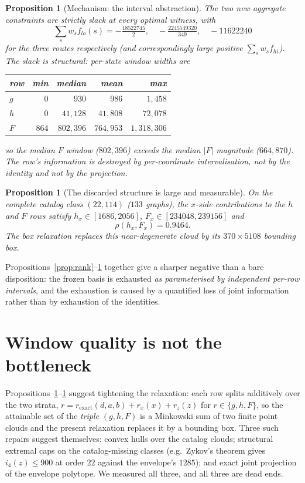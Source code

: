 \documentclass[11pt]{article}
\newtheorem{proposition}[theorem]{Proposition}
\theoremstyle{definition}
\begin{document}
\begin{proposition}[Mechanism: the interval abstraction]\label{prop:mech}
The two new aggregate constraints are strictly slack at every optimal witness,
with
\[
\textstyle\sum_s w_sf_{lo}(s)=-\tfrac{18522745}{2},\quad
-\tfrac{2245549320}{349},\quad -11622240
\]
for the three routes respectively (and correspondingly large positive
$\sum_s w_sf_{hi}$). The slack is structural: per-state window widths are
\begin{center}
\begin{tabular}{lrrrr}
\toprule
row & min & median & mean & max\\
\midrule
$g$ & $0$ & $930$ & $986$ & $1{,}458$\\
$h$ & $0$ & $41{,}128$ & $41{,}808$ & $72{,}078$\\
$F$ & $864$ & $802{,}396$ & $764{,}953$ & $1{,}318{,}306$\\
\bottomrule
\end{tabular}
\end{center}
so the median $F$ window ($802{,}396$) exceeds the median $|F|$ magnitude
($664{,}870$). The row's information is destroyed by per-coordinate
intervalisation, not by the identity and not by the projection.
\end{proposition}

\begin{proposition}[The discarded structure is large and measurable]\label{prop:corr}
On the complete catalog class $(22,114)$ ($133$ graphs), the $x$-side
contributions to the $h$ and $F$ rows satisfy
$h_x\in[1686,2056]$, $F_x\in[234048,239156]$ and
\[
\rho(h_x,F_x)=0.9464 .
\]
The box relaxation replaces this near-degenerate cloud by its
$370\times5108$ bounding box.
\end{proposition}

Propositions~\ref{prop:rank}--\ref{prop:corr} together give a sharper negative
than a bare disposition: the frozen basis is exhausted \emph{as parameterised by
independent per-row intervals}, and the exhaustion is caused by a quantified
loss of joint information rather than by exhaustion of the identities.

\section{Window quality is not the bottleneck}\label{sec:notwindows}

Propositions~\ref{prop:mech}--\ref{prop:corr} suggest tightening the relaxation:
each row splits additively over the two strata,
$r=r_{\text{exact}}(d,a,b)+r_x(x)+r_z(z)$ for $r\in\{g,h,F\}$, so the attainable
set of the \emph{triple} $(g,h,F)$ is a Minkowski sum of two finite point
clouds and the present relaxation replaces it by a bounding box. Three such
repairs suggest themselves: convex hulls over the catalog clouds; structural
extremal caps on the catalog-missing classes (e.g.\ Zykov's theorem gives
$i_4(z)\le900$ at order $22$ against the envelope's $1285$); and exact joint
projection of the envelope polytope. We measured all three, and all three are
dead ends.
\end{document}
